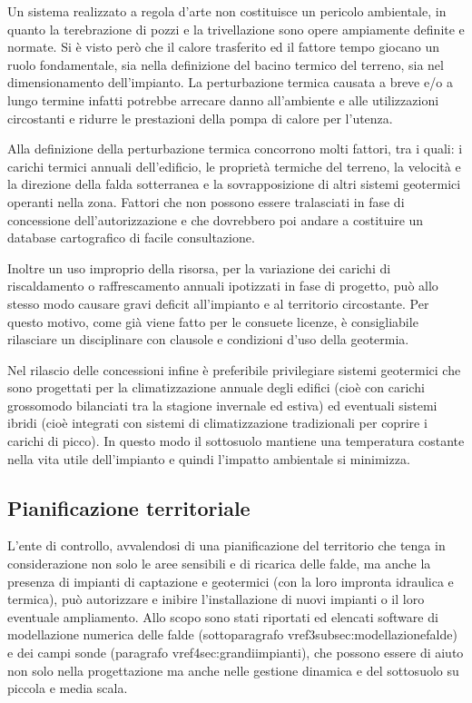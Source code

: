 Un sistema realizzato a regola d'arte non costituisce un pericolo ambientale, in quanto la terebrazione di pozzi e la trivellazione sono opere ampiamente definite e normate. Si è visto però che il calore trasferito ed il fattore tempo giocano un ruolo fondamentale, sia nella definizione del bacino termico del terreno, sia nel dimensionamento dell'impianto. La perturbazione termica causata a breve e/o a lungo termine infatti potrebbe arrecare danno all'ambiente e alle utilizzazioni circostanti e ridurre le prestazioni della pompa di calore per l'utenza.

Alla definizione della perturbazione termica concorrono molti fattori, tra i quali: i carichi termici annuali dell'edificio, le proprietà termiche del terreno, la velocità e la direzione della falda sotterranea e la sovrapposizione di altri sistemi geotermici operanti nella zona. Fattori che non possono essere tralasciati in fase di concessione dell'autorizzazione e che dovrebbero poi andare a costituire un database cartografico di facile consultazione.

Inoltre un uso improprio della risorsa, per la variazione dei carichi di riscaldamento o raffrescamento annuali ipotizzati in fase di progetto, può allo stesso modo causare gravi deficit all'impianto e al territorio circostante. Per questo motivo, come già viene fatto per le consuete licenze, è consigliabile rilasciare un disciplinare con clausole e condizioni d'uso della geotermia.

Nel rilascio delle concessioni infine è preferibile privilegiare sistemi geotermici che sono progettati per la climatizzazione annuale degli edifici (cioè con carichi grossomodo bilanciati tra la stagione invernale ed estiva) ed eventuali sistemi ibridi (cioè integrati con sistemi di climatizzazione tradizionali per coprire i carichi di picco). In questo modo il sottosuolo mantiene una temperatura costante nella vita utile dell'impianto e quindi l'impatto ambientale si minimizza.


\subsection{Pianificazione territoriale}
L'ente di controllo, avvalendosi di una pianificazione del territorio che tenga in considerazione non solo le aree sensibili e di ricarica delle falde, ma anche la presenza di impianti di captazione e geotermici (con la loro impronta idraulica e termica), può autorizzare e inibire l'installazione di nuovi impianti o il loro eventuale ampliamento. Allo scopo sono stati riportati ed elencati software di modellazione numerica delle falde (sottoparagrafo vref{3subsec:modellazionefalde}) e dei campi sonde (paragrafo vref{4sec:grandiimpianti}), che possono essere di aiuto non solo nella progettazione ma anche nelle gestione dinamica e del sottosuolo su piccola e media scala.


